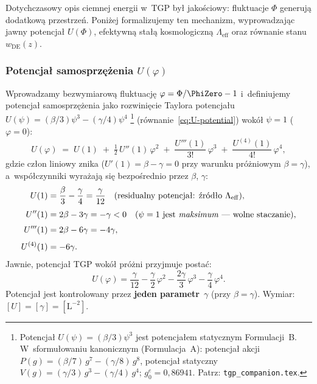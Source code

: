 Dotychczasowy opis ciemnej energii w~TGP by\l{} jako\'sciowy:
fluktuacje $\Phi$ generuj\k{a} dodatkow\k{a} przestrze\'n.
Poni\.zej formalizujemy ten mechanizm, wyprowadzaj\k{a}c
jawny potencja\l{} $U(\Phi)$, efektywn\k{a} sta\l{}\k{a}
kosmologiczn\k{a} $\Lambda_{\mathrm{eff}}$ oraz r\'ownanie
stanu $w_{\mathrm{DE}}(z)$.

\subsubsection{Potencja\l{} samosprz\k{e}\.zenia $U(\varphi)$}

\begin{definition}\label{def:U-DE}
Wprowadzamy bezwymiarow\k{a} fluktuacj\k{e}
$\varphi = \Phi/\PhiZero - 1$ i~definiujemy potencja\l{}
samosprz\k{e}\.zenia jako rozwinięcie Taylora potencja\l{}u
$U(\psi) = (\beta/3)\psi^3 - (\gamma/4)\psi^4$%
\footnote{Potencja\l{} $U(\psi) = (\beta/3)\psi^3$ jest potencja\l{}em
statycznym Formulacji~B. W~sformu\l{}owaniu kanonicznym (Formulacja~A):
potencja\l{} akcji $P(g) = (\beta/7)\,g^7 - (\gamma/8)\,g^8$,
potencja\l{} statyczny $V(g) = (\gamma/3)\,g^3 - (\gamma/4)\,g^4$;
$g_0^e = 0{,}86941$. Patrz: \texttt{tgp\_companion.tex}.}
(r\'ownanie~\ref{eq:U-potential}) wok\'o\l{}
$\psi = 1$ ($\varphi = 0$):
\begin{equation}\label{eq:U-phi-def}
  \boxed{
    U(\varphi)
    \;=\; U(1) \;+\; \tfrac{1}{2}\,U''(1)\,\varphi^2
    \;+\; \frac{U'''(1)}{3!}\,\varphi^3
    \;+\; \frac{U^{(4)}(1)}{4!}\,\varphi^4,
  }
\end{equation}
gdzie cz\l{}on liniowy znika ($U'(1) = \beta - \gamma = 0$
przy warunku pr\'o\.zniowym $\beta = \gamma$),
a~wsp\'o\l{}czynniki wyra\.zaj\k{a} si\k{e} bezpo\'srednio
przez $\beta$, $\gamma$:
\begin{align}
  U(1) &= \frac{\beta}{3} - \frac{\gamma}{4}
    = \frac{\gamma}{12}
    \quad (\text{residualny potencja\l{}: \'zr\'od\l{}o }\Lambda_{\mathrm{eff}}),
    \label{eq:U1-from-bg} \\[3pt]
  U''(1) &= 2\beta - 3\gamma = -\gamma < 0
    \quad (\text{$\psi = 1$ jest \emph{maksimum} --- wolne staczanie}),
    \label{eq:meff-from-bg} \\[3pt]
  U'''(1) &= 2\beta - 6\gamma = -4\gamma,
    \label{eq:l3-from-bg} \\[3pt]
  U^{(4)}(1) &= -6\gamma.
    \label{eq:l4-from-bg}
\end{align}
Jawnie, potencja\l{} TGP wok\'o\l{} pr\'o\.zni przyjmuje posta\'c:
\begin{equation}\label{eq:U-phi-explicit}
  U(\varphi) = \frac{\gamma}{12}
  - \frac{\gamma}{2}\,\varphi^2
  - \frac{2\gamma}{3}\,\varphi^3
  - \frac{\gamma}{4}\,\varphi^4.
\end{equation}
Potencja\l{} jest kontrolowany przez \textbf{jeden parametr}~$\gamma$
(przy $\beta = \gamma$). Wymiar: $[U] = [\gamma] = [\mathrm{L}^{-2}]$.
\end{definition}

